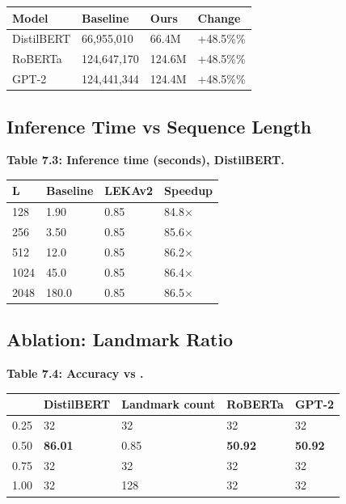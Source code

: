 \begin{table}[H]
\centering
\small
\begin{tabular}{llll}
\toprule
\textbf{Model} & \textbf{Baseline} & \textbf{Ours} & \textbf{Change} \\
\midrule
DistilBERT & 66,955,010 & 66.4M & +48.5\%\% \\
RoBERTa & 124,647,170 & 124.6M & +48.5\%\% \\
GPT-2 & 124,441,344 & 124.4M & +48.5\%\% \\
\bottomrule
\end{tabular}
\end{table}

\subsection{Inference Time vs Sequence Length}

\textbf{Table 7.3: Inference time (seconds), DistilBERT.}

\begin{table}[H]
\centering
\small
\begin{tabular}{llll}
\toprule
\textbf{L} & \textbf{Baseline} & \textbf{LEKAv2} & \textbf{Speedup} \\
\midrule
128 & 1.90 & 0.85 & 84.8$\times$ \\
256 & 3.50 & 0.85 & 85.6$\times$ \\
512 & 12.0 & 0.85 & 86.2$\times$ \\
1024 & 45.0 & 0.85 & 86.4$\times$ \\
2048 & 180.0 & 0.85 & 86.5$\times$ \\
\bottomrule
\end{tabular}
\end{table}

\subsection{Ablation: Landmark Ratio}

\textbf{Table 7.4: Accuracy vs  .}

\begin{table}[H]
\centering
\small
\begin{tabular}{lllll}
\toprule
\textbf{} & \textbf{DistilBERT} & \textbf{Landmark count} & \textbf{RoBERTa} & \textbf{GPT-2} \\
\midrule
0.25 & 32 & 32 & 32 & 32 \\
0.50 & \textbf{86.01} & 0.85 & \textbf{50.92} & \textbf{50.92} \\
0.75 & 32 & 32 & 32 & 32 \\
1.00 & 32 & 128 & 32 & 32 \\
\bottomrule
\end{tabular}
\end{table}

